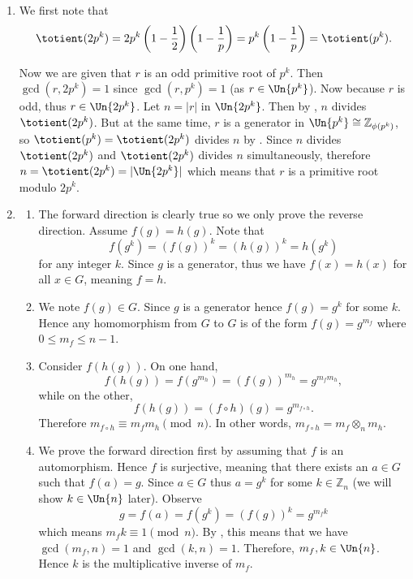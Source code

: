 \begin{enumerate}
    \item We first note that
    \[
        \totient(2p^k) = 2p^k\left(1-\frac12\right)\left(1-\frac1p\right) = p^k\left(1-\frac1p\right) = \totient(p^k).
    \]

    Now we are given that $r$ is an odd primitive root of $p^k$. Then $\gcd(r, 2p^k) = 1$ since $\gcd(r, p^k) = 1$ (as $r \in \Un{p^k}$). Now because $r$ is odd, thus $r \in \Un{2p^k}$. Let $n = |r|$ in $\Un{2p^k}$. Then by , $n$ divides $\totient(2p^k)$. But at the same time, $r$ is a generator in $\Un{p^k} \cong \mathbb{Z}_{\phi(p^k)}$, so $\totient(p^k) = \totient(2p^k)$ divides $n$ by . Since $n$ divides $\totient(2p^k)$ and $\totient(2p^k)$ divides $n$ simultaneously, therefore $n = \totient(2p^k) = |\Un{2p^k}|$ which means that $r$ is a primitive root modulo $2p^k$.
    
    \item \begin{enumerate}[label=(\roman*)]
        \item The forward direction is clearly true so we only prove the reverse direction. Assume $f(g) = h(g)$. Note that
        \[
            f(g^k) = (f(g))^k = (h(g))^k = h(g^k)    
        \]
        for any integer $k$. Since $g$ is a generator, thus we have $f(x) = h(x)$ for all $x \in G$, meaning $f = h$.
        
        \item We note $f(g) \in G$. Since $g$ is a generator hence $f(g) = g^k$ for some $k$. Hence any homomorphism from $G$ to $G$ is of the form $f(g) = g^{m_f}$ where $0 \leq m_f \leq n-1$.
        
        \item Consider $f(h(g))$. On one hand,
        \[
            f(h(g)) = f(g^{m_h}) = (f(g))^{m_h} = g^{m_fm_h},
        \]
        while on the other,
        \[
            f(h(g)) = (f \circ h)(g) = g^{m_{f\circ h}}.     
        \]
        Therefore $m_{f\circ h} \equiv m_fm_h \pmod n$. In other words, $m_{f\circ h} = m_f \otimes_n m_h$.
        
        \item We prove the forward direction first by assuming that $f$ is an automorphism. Hence $f$ is surjective, meaning that there exists an $a \in G$ such that $f(a) = g$. Since $a \in G$ thus $a = g^k$ for some $k \in \mathbb{Z}_n$ (we will show $k \in \Un{n}$ later). Observe
        \[
            g = f(a) = f(g^k) = (f(g))^k = g^{m_fk}        
        \]
        which means $m_fk \equiv 1 \pmod n$. By , this means that we have $\gcd(m_f, n) = 1$ and $\gcd(k, n) = 1$. Therefore, $m_f, k \in \Un{n}$. Hence $k$ is the multiplicative inverse of $m_f$.
        

\end{enumerate}
\end{enumerate}
